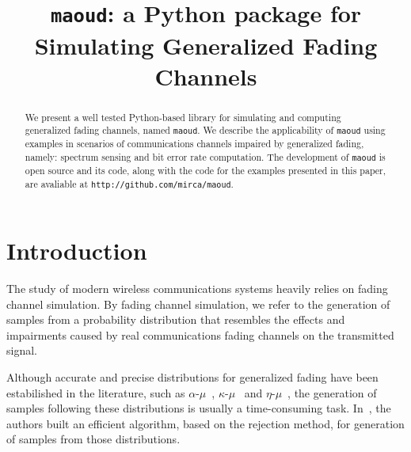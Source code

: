 \documentclass[conference, 10pt]{IEEEtran}
\begin{document}
\title{\texttt{maoud}: a Python package for Simulating Generalized Fading Channels}

\author{
}

\maketitle

\begin{abstract}
    We present a well tested Python-based library for simulating and computing
    generalized fading channels, named \texttt{maoud}. We describe the
    applicability of \texttt{maoud} using examples in scenarios of communications
    channels impaired by generalized fading, namely: spectrum sensing and bit error
    rate computation. The development of \texttt{maoud} is open source and its code,
    along with the code for the examples presented in this paper, are avaliable at
    \texttt{http://github.com/mirca/maoud}.
\end{abstract}

\IEEEpeerreviewmaketitle
\section{Introduction}

The study of modern wireless communications systems heavily relies on fading channel simulation.
By fading channel simulation, we refer to the generation of samples from a probability distribution
that resembles the effects and impairments caused by real communications fading channels on the
transmitted signal.

Although accurate and precise distributions for generalized fading have been
estabilished in the literature, such as $\alpha\text{-}\mu$~\cite{yacoub.2007.1},
$\kappa\text{-}\mu$~\cite{yacoub.2007.2} and $\eta\text{-}\mu$~\cite{yacoub.2007.2},
the generation of samples following these distributions is usually
a time-consuming task. In~\cite{cogliatti2012}, the authors built an efficient
algorithm, based on the rejection method, for generation of samples from those
distributions.
\end{document}

